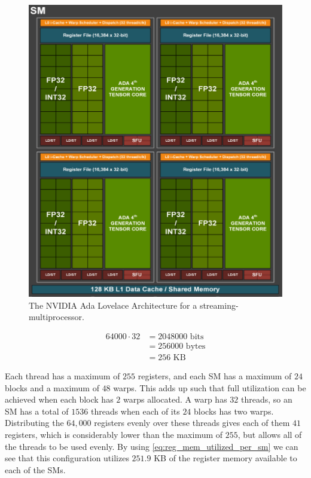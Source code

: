 \begin{figure}[H]
\centering
\includegraphics[scale=0.3]{images/nvidia-ada-gpu-architecture}
\caption{The NVIDIA Ada Lovelace Architecture for a streaming-multiprocessor. \cite[Figure 5]{nvidia-ada-architecture}}
\label{fig:ada-architecture}
\end{figure}

\begin{equation}
\begin{split}
  64000 \cdot 32 &= 2048000 \text{ bits}\\
  &= 256000 \text{ bytes}\\
  &= 256 \text{ KB}
\end{split}
\end{equation}

Each thread has a maximum of $255$ registers, and each SM has a maximum of $24$ blocks and a maximum of $48$ warps. This adds up such that full utilization can be achieved when each block has $2$ warps allocated. A warp has $32$ threads, so an SM has a total of $1536$ threads when each of its $24$ blocks has two warps.
Distributing the $64,000$ registers evenly over these threads gives each of them $41$ registers, which is considerably lower than the maximum of $255$, but allows all of the threads to be used evenly. By using \autoref{eq:reg_mem_utilized_per_sm} we can see that this configuration utilizes $251.9$ KB of the register memory available to each of the SMs.


